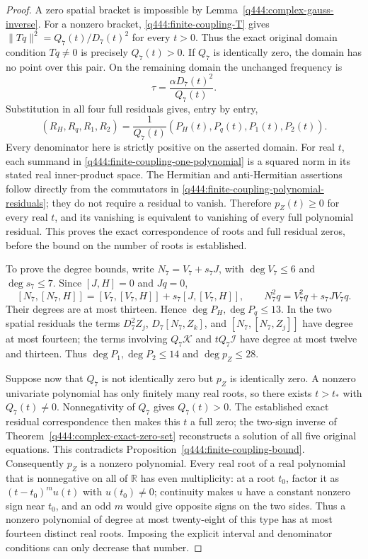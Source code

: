 \begin{proof}
A zero spatial bracket is impossible by
Lemma~\ref{q444:complex-gauss-inverse}. For a nonzero bracket,
\eqref{q444:finite-coupling-T} gives
$\|Tq\|^2=Q_7(t)/D_7(t)^2$ for every $t>0$.
Thus the exact original domain condition $Tq\ne0$ is precisely
$Q_7(t)>0$. If $Q_7$ is identically zero, the domain has no point over
this pair. On the remaining domain the unchanged frequency is
\[
 \tau=\frac{\alpha D_7(t)^2}{Q_7(t)}.
\]
Substitution in all four full residuals gives, entry by entry,
\begin{equation}
 (R_H,R_q,R_1,R_2)
   =\frac1{Q_7(t)}(P_H(t),P_q(t),P_1(t),P_2(t)).
 \label{q444:finite-coupling-exact-residual-map}
\end{equation}
Every denominator here is strictly positive on the asserted domain.
For real $t$, each summand in \eqref{q444:finite-coupling-one-polynomial}
is a squared norm in its stated real inner-product space. The Hermitian
and anti-Hermitian assertions follow directly from the commutators in
\eqref{q444:finite-coupling-polynomial-residuals}; they do not require a
residual to vanish. Therefore $p_Z(t)\ge0$ for every real $t$, and its
vanishing is equivalent to vanishing of every full polynomial residual.
This proves the exact correspondence of roots and full residual zeros,
before the bound on the number of roots is established.

To prove the degree bounds, write $N_7=V_7+s_7J$, with
$\deg V_7\le6$ and $\deg s_7\le7$. Since $[J,H]=0$ and $Jq=0$,
\[
 [N_7,[N_7,H]]=[V_7,[V_7,H]]+s_7[J,[V_7,H]],
 \qquad
 N_7^2q=V_7^2q+s_7JV_7q.
\]
Their degrees are at most thirteen. Hence $\deg P_H,\deg P_q\le13$.
In the two spatial residuals the terms $D_7^2Z_j$,
$D_7[N_7,Z_k]$, and $[N_7,[N_7,Z_j]]$ have degree at most fourteen;
the terms involving $Q_7\mathcal K$ and $tQ_7\mathcal I$ have degree
at most twelve and thirteen. Thus $\deg P_1,\deg P_2\le14$ and
$\deg p_Z\le28$.

Suppose now that $Q_7$ is not identically zero but $p_Z$ is identically
zero. A nonzero univariate polynomial has only finitely many real
roots, so there exists $t>t_*$ with $Q_7(t)\ne0$. Nonnegativity of
$Q_7$ gives $Q_7(t)>0$. The established exact residual correspondence
then makes this $t$ a full zero; the two-sign inverse of
Theorem~\ref{q444:complex-exact-zero-set} reconstructs a solution of all
five original equations. This contradicts
Proposition~\ref{q444:finite-coupling-bound}. Consequently $p_Z$ is a
nonzero polynomial. Every real root of a real polynomial that is
nonnegative on all of $\mathbb R$ has even multiplicity: at a root
$t_0$, factor it as $(t-t_0)^m u(t)$ with $u(t_0)\ne0$; continuity
makes $u$ have a constant nonzero sign near $t_0$, and an odd $m$ would
give opposite signs on the two sides. Thus a nonzero polynomial of
degree at most twenty-eight of this type has at most fourteen distinct
real roots. Imposing the explicit interval and denominator conditions
can only decrease that number.


\end{proof}
